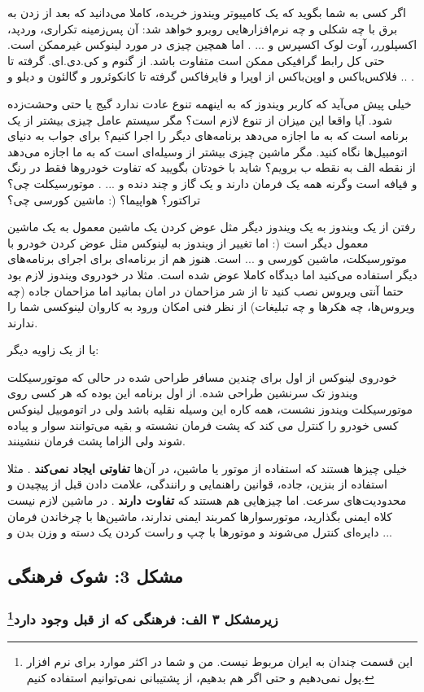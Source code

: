 اگر کسی به شما بگوید که یک کامپیوتر ویندوز 
خریده، کاملا می‌دانید که بعد از زدن به برق با چه شکلی و چه نرم‌افزارهایی روبرو خواهد شد: آن پس‌زمینه تکراری، وردپد، اکسپلورر، آوت لوک اکسپرس و ... . اما همچین چیزی در مورد لینوکس غیرممکن است. حتی کل رابط گرافیکی ممکن است متفاوت باشد. از گنوم و کی.دی.ای. گرفته تا فلاکس‌باکس و اوپن‌باکس از اوپرا و فایرفاکس گرفته تا کانکوئرور و گالئون و دیلو و .. .

خیلی پیش می‌آید که کاربر ویندوز که به اینهمه تنوع عادت ندارد گیج یا حتی وحشت‌زده شود. آیا واقعا این میزان از تنوع لازم است؟ مگر سیستم عامل چیزی بیشتر از یک برنامه است که به ما اجازه می‌دهد برنامه‌های دیگر را اجرا کنیم؟ برای جواب به دنیای اتومبیل‌ها نگاه کنید. مگر ماشین چیزی بیشتر از وسیله‌ای است که به ما اجازه می‌دهد از نقطه الف به نقطه ب برویم؟ شاید با خودتان بگویید که تفاوت خودروها فقط در رنگ و قیافه است وگرنه همه یک فرمان دارند و یک گاز و چند دنده و ... . موتورسیکلت چی؟ تراکتور؟ هواپیما؟ (: ماشین کورسی چی؟

رفتن از یک ویندوز به یک ویندوز دیگر مثل عوض کردن یک ماشین معمول به یک ماشین معمول دیگر است (:‌ اما تغییر از ویندوز به لینوکس مثل عوض کردن خودرو با موتورسیکلت، ماشین کورسی و ... است. هنوز هم از برنامه‌ای برای اجرای برنامه‌های دیگر استفاده می‌کنید اما دیدگاه کاملا عوض شده است. مثلا در خودروی ویندوز لازم بود حتما آنتی ویروس نصب کنید تا از شر مزاحمان در امان بمانید اما مزاحمان جاده (چه ویروس‌ها، چه هکرها و چه تبلیغات) از نظر فنی امکان ورود به کاروان لینوکسی شما را ندارند.

یا از یک زاویه دیگر:

خودروی لینوکس از اول برای چندین مسافر طراحی شده در حالی که موتورسیکلت ویندوز تک سرنشین طراحی شده. از اول برنامه این بوده که هر کسی روی موتورسیکلت ویندوز نشست، همه کاره این وسیله نقلیه باشد ولی در اتوموبیل لینوکس کسی خودرو را کنترل می کند که پشت فرمان نشسته و بقیه می‌توانند سوار و پیاده شوند ولی الزاما پشت فرمان ننشینند.

خیلی چیزها هستند که استفاده از موتور یا ماشین،‌ در آن‌ها
\textbf{تفاوتی ایجاد نمی‌کند}
. مثلا استفاده از بنزین، جاده، قوانین راهنمایی و رانندگی، علامت دادن قبل از پیچیدن و محدودیت‌های سرعت.
اما چیزهایی هم هستند که
\textbf{تفاوت دارند}
. در ماشین لازم نیست کلاه ایمنی بگذارید، موتورسوارها کمربند ایمنی ندارند، ماشین‌ها با چرخاندن فرمان دایره‌ای کنترل می‌شوند و موتورها با چپ و راست کردن یک دسته و وزن بدن و ...
\subsection*{مشکل 3: شوک فرهنگی}
\subsubsection*{زیرمشکل ۳ الف: فرهنگی که از قبل وجود دارد\footnote{
		این قسمت چندان به ایران مربوط نیست. من و شما در اکثر موارد برای نرم افزار پول نمی‌دهیم و حتی اگر هم بدهیم، از پشتیبانی نمی‌توانیم استفاده کنیم.
}}

